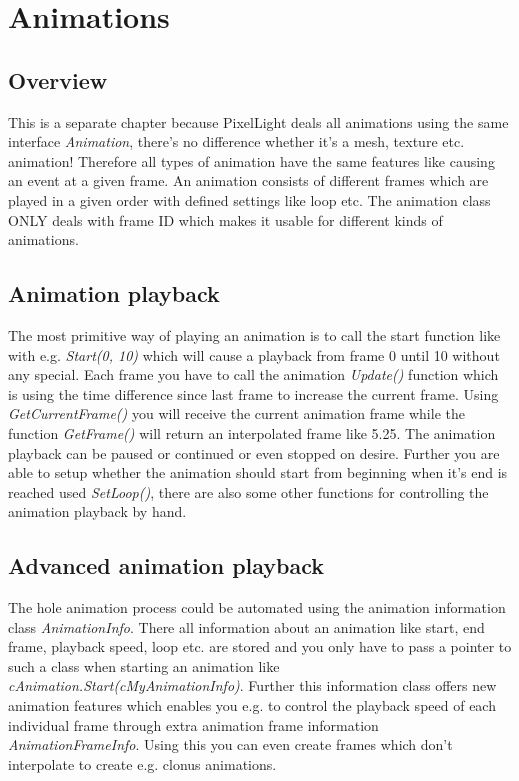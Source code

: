 \chapter{Animations}




\section{Overview}
This is a separate chapter because PixelLight deals all animations using the same interface \emph{Animation}, there's no difference whether it's a mesh, texture etc. animation! Therefore all types of animation have the same features like causing an event at a given frame. An animation consists of different frames which are played in a given order with defined settings like loop etc. The animation class ONLY deals with frame ID which makes it usable for different kinds of animations.




\section{Animation playback}
The most primitive way of playing an animation is to call the start function like with e.g. \emph{Start(0, 10)} which will cause a playback from frame 0 until 10 without any special. Each frame you have to call the animation \emph{Update()} function which is using the time difference since last frame to increase the current frame. Using \emph{GetCurrentFrame()} you will receive the current animation frame while the function \emph{GetFrame()} will return an interpolated frame like 5.25. The animation playback can be paused or continued or even stopped on desire. Further you are able to setup whether the animation should start from beginning when it's end is reached used \emph{SetLoop()}, there are also some other functions for controlling the animation playback by hand.




\section{Advanced animation playback}
The hole animation process could be automated using the animation information class \emph{AnimationInfo}. There all information about an animation like start, end frame, playback speed, loop etc. are stored and you only have to pass a pointer to such a class when starting an animation like \emph{cAnimation.Start(cMyAnimationInfo)}. Further this information class offers new animation features which enables you e.g. to control the playback speed of each individual frame through extra animation frame information \emph{AnimationFrameInfo}. Using this you can even create frames which don't interpolate to create e.g. clonus animations.
